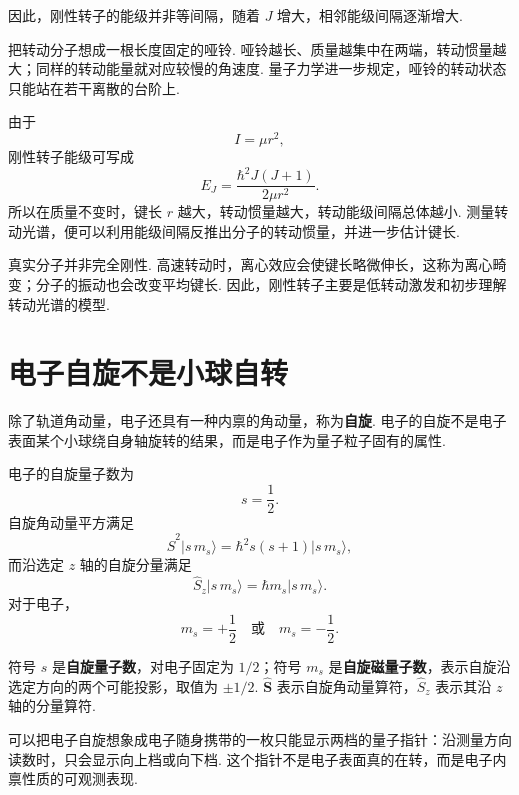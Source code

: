 \documentclass[UTF8,11pt,a4paper,openany]{ctexbook}
\newcommand{\ket}[1]{\lvert #1\rangle}\newcommand{\bra}[1]{\langle #1\rvert}
\newcommand{\term}[1]{\textbf{#1}}
\begin{document}
因此，刚性转子的能级并非等间隔，随着 $J$ 增大，相邻能级间隔逐渐增大. 

\begin{analogybox}
把转动分子想成一根长度固定的哑铃. 哑铃越长、质量越集中在两端，转动惯量越大；同样的转动能量就对应较慢的角速度. 量子力学进一步规定，哑铃的转动状态只能站在若干离散的台阶上. 
\end{analogybox}

\begin{derivationbox}
由于
\[
I=\mu r^2,
\]
刚性转子能级可写成
\[
E_J=\frac{\hbar^2J(J+1)}{2\mu r^2}.
\]
所以在质量不变时，键长 $r$ 越大，转动惯量越大，转动能级间隔总体越小. 测量转动光谱，便可以利用能级间隔反推出分子的转动惯量，并进一步估计键长. 
\end{derivationbox}

\begin{limitbox}
真实分子并非完全刚性. 高速转动时，离心效应会使键长略微伸长，这称为离心畸变；分子的振动也会改变平均键长. 因此，刚性转子主要是低转动激发和初步理解转动光谱的模型. 
\end{limitbox}

\section{电子自旋不是小球自转}

除了轨道角动量，电子还具有一种内禀的角动量，称为\term{自旋}. 电子的自旋不是电子表面某个小球绕自身轴旋转的结果，而是电子作为量子粒子固有的属性. 

\begin{definitionbox}
电子的自旋量子数为
\[
s=\frac12.
\]
自旋角动量平方满足
\[
\hat S^2\ket{s\,m_s}
=\hbar^2s(s+1)\ket{s\,m_s},
\]
而沿选定 $z$ 轴的自旋分量满足
\[
\hat S_z\ket{s\,m_s}
=\hbar m_s\ket{s\,m_s}.
\]
对于电子，
\[
m_s=+\frac12
\quad\text{或}\quad
m_s=-\frac12.
\]
\end{definitionbox}

\begin{notationbox}
符号 $s$ 是\term{自旋量子数}，对电子固定为 $1/2$；符号 $m_s$ 是\term{自旋磁量子数}，表示自旋沿选定方向的两个可能投影，取值为 $\pm1/2$. $\hat{\boldsymbol S}$ 表示自旋角动量算符，$\hat S_z$ 表示其沿 $z$ 轴的分量算符. 
\end{notationbox}

\begin{analogybox}
可以把电子自旋想象成电子随身携带的一枚只能显示两档的量子指针：沿测量方向读数时，只会显示向上档或向下档. 这个指针不是电子表面真的在转，而是电子内禀性质的可观测表现. 
\end{analogybox}
\end{document}
